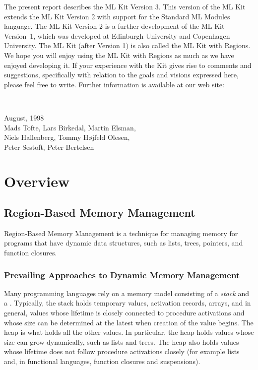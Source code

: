 \documentclass[12pt]{book}
\begin{document}
The present report describes the ML Kit
Version 3. This version of the ML Kit extends the ML Kit Version 2
with support for the Standard ML Modules language. The ML Kit Version 2 is a further development of the
ML Kit Version~1, which was developed at
Edinburgh University and Copenhagen University.  The ML Kit (after
Version 1) is also called the ML Kit with Regions.  We hope you will
enjoy using the ML Kit with Regions as much as we have enjoyed
developing it. If your experience with the Kit gives rise to comments
and suggestions, specifically with relation to the goals and visions
expressed here, please feel free to write.  Further information is
available at our web site:
\begin{tabbing}
\hskip2cm\\
\hskip2cm\quad{}
\end{tabbing}

\begin{flushright}
August, 1998\\[1cm]
Mads Tofte, Lars Birkedal, Martin Elsman,\\
Niels Hallenberg, Tommy H\o jfeld Olesen,\\
Peter Sestoft, Peter Bertelsen
\end{flushright}
\part{Overview}
\chapter{Region-Based Memory Management}
\label{intro.sec}
Region-Based Memory Management is a technique for managing
memory for programs that have dynamic data structures, such as lists,
trees, pointers, and function closures.

\section{Prevailing Approaches to Dynamic Memory Management}
Many programming languages rely on a memory model consisting of a 
{\em stack} and a . Typically, the stack 
holds temporary values, activation records, arrays, and in general, values
whose lifetime is closely connected to procedure activations and whose size
can be determined at the latest when creation of the value begins.
The heap is what holds all the other values. In particular, the heap holds values whose size 
can grow dynamically, such as lists and trees. The heap also holds values whose lifetime
does not follow procedure activations closely (for example lists and, in functional
languages, function closures and suspensions).
\end{document}

